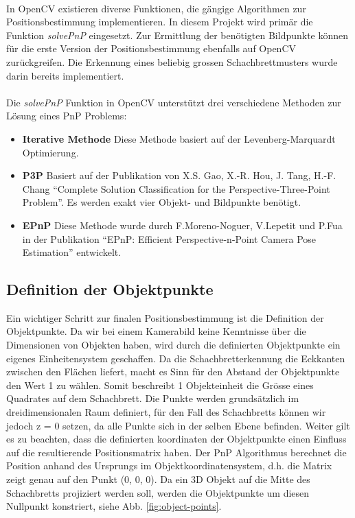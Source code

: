 \paragraph{}
In OpenCV existieren diverse Funktionen, die gängige Algorithmen zur Positionsbestimmung implementieren. In diesem Projekt wird primär die Funktion \textit{solvePnP} eingesetzt. Zur Ermittlung der benötigten Bildpunkte können für die erste Version der Positionsbestimmung ebenfalls auf OpenCV zurückgreifen. Die Erkennung eines beliebig grossen Schachbrettmusters wurde darin bereits implementiert. 

\paragraph{}
Die \textit{solvePnP} Funktion in OpenCV unterstützt drei verschiedene Methoden zur Lösung eines PnP Problems:

\begin{itemize}

\item \textbf{Iterative Methode}
Diese Methode basiert auf der Levenberg-Marquardt Optimierung.

\item \textbf{P3P}
Basiert auf der Publikation von X.S. Gao, X.-R. Hou, J. Tang, H.-F. Chang ``Complete Solution Classification for the Perspective-Three-Point Problem''. Es werden exakt vier Objekt- und Bildpunkte benötigt.

\item \textbf{EPnP}
Diese Methode wurde durch F.Moreno-Noguer, V.Lepetit und P.Fua in der Publikation ``EPnP: Efficient Perspective-n-Point Camera Pose Estimation'' entwickelt.

\end{itemize}


\subsection{Definition der Objektpunkte}
\label{sec:definition-objektpunkte}

Ein wichtiger Schritt zur finalen Positionsbestimmung ist die Definition der Objektpunkte. Da wir bei einem Kamerabild keine Kenntnisse über die Dimensionen von Objekten haben, wird durch die definierten Objektpunkte ein eigenes Einheitensystem geschaffen. Da die Schachbretterkennung die Eckkanten zwischen den Flächen liefert, macht es Sinn für den Abstand der Objektpunkte den Wert 1 zu wählen. Somit beschreibt 1 Objekteinheit die Grösse eines Quadrates auf dem Schachbrett. Die Punkte werden grundsätzlich im dreidimensionalen Raum definiert, für den Fall des Schachbretts können wir jedoch z = 0 setzen, da alle Punkte sich in der selben Ebene befinden.
\noindent
Weiter gilt es zu beachten, dass die definierten koordinaten der Objektpunkte einen Einfluss auf die resultierende Positionsmatrix haben. Der PnP Algorithmus berechnet die Position anhand des Ursprungs im Objektkoordinatensystem, d.h. die Matrix zeigt genau auf den Punkt (0, 0, 0). 
Da ein 3D Objekt auf die Mitte des Schachbretts projiziert werden soll, werden die Objektpunkte um diesen Nullpunkt konstriert, siehe Abb. \ref{fig:object-points}.


